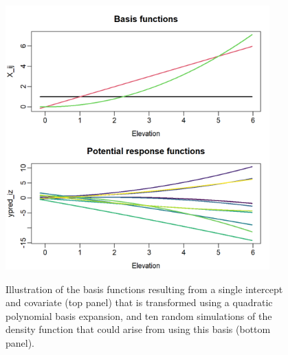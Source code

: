 \begin{figure}[!ht]
    \caption[Basis functions using 2nd-order polynomial basis expansion]{Illustration of the basis functions resulting from a single intercept and covariate (top panel) that is transformed using a quadratic polynomial basis expansion, and ten random simulations of the density function that could arise from using this basis (bottom panel).}
    \centering
    \includegraphics[width=4in]{Chap_5/Basis-polynomial.png}
    \label{fig:Chap5_Basis_polynomial}
\end{figure}

